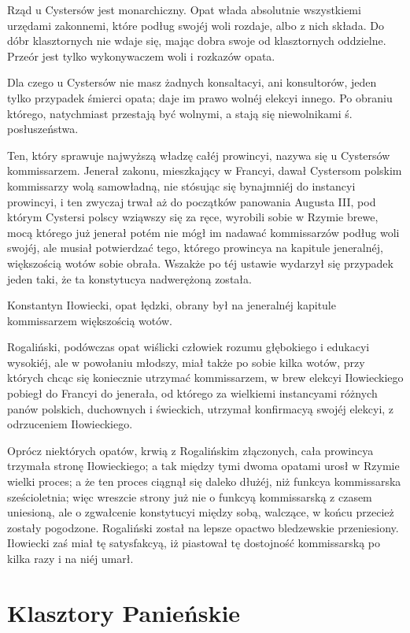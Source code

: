 \documentclass{book}
\begin{document}
Rząd u Cystersów jest monarchiczny. Opat włada absolutnie wszystkiemi urzędami zakonnemi, które podług swojéj woli rozdaje, albo z nich składa. Do dóbr klasztornych nie wdaje się, mając dobra swoje od klasztornych oddzielne. Przeór jest tylko wykonywaczem woli i rozkazów opata.

Dla czego u Cystersów nie masz żadnych konsaltacyi, ani konsultorów, jeden tylko przypadek śmierci opata; daje im prawo wolnéj elekcyi innego. Po obraniu którego, natychmiast przestają być wolnymi, a stają się niewolnikami ś. posłuszeństwa.

Ten, który sprawuje najwyższą władzę całéj prowincyi, nazywa się u Cystersów kommissarzem. Jenerał zakonu, mieszkający w Francyi, dawał Cystersom polskim kommissarzy wolą samowładną, nie stósując się bynajmniéj do instancyi prowincyi, i ten zwyczaj trwał aż do początków panowania Augusta III, pod którym Cystersi polscy wziąwszy się za ręce, wyrobili sobie w Rzymie brewe, mocą którego już jenerał potém nie mógł im nadawać kommissarzów podług woli swojéj, ale musiał potwierdzać tego, którego prowincya na kapitule jeneralnéj, większością wotów sobie obrała. Wszakże po téj ustawie wydarzył się przypadek jeden taki, że ta konstytucya nadwerężoną została.

Konstantyn Iłowiecki, opat łędzki, obrany był na jeneralnéj kapitule kommissarzem większością wotów.

Rogaliński, podówczas opat wiślicki człowiek rozumu głębokiego i edukacyi wysokiéj, ale w powołaniu młodszy, miał także po sobie kilka wotów, przy których chcąc się koniecznie utrzymać kommissarzem, w brew elekcyi Iłowieckiego pobiegł do Francyi do jenerała, od którego za wielkiemi instancyami różnych panów polskich, duchownych i świeckich, utrzymał konfirmacyą swojéj elekcyi, z odrzuceniem Iłowieckiego.

Oprócz niektórych opatów, krwią z Rogalińskim złączonych, cała prowincya trzymała stronę Iłowieckiego; a tak między tymi dwoma opatami urosł w Rzymie wielki proces; a że ten proces ciągnął się daleko dłużéj, niż funkcya kommissarska sześcioletnia; więc wreszcie strony już nie o funkcyą kommissarską z czasem uniesioną, ale o zgwałcenie konstytucyi między sobą, walczące, w końcu przecież zostały pogodzone. Rogaliński został na lepsze opactwo bledzewskie przeniesiony. Iłowiecki zaś miał tę satysfakcyą, iż piastował tę dostojność kommissarską po kilka razy i na niéj umarł.

\section{Klasztory Panieńskie}
\end{document}
